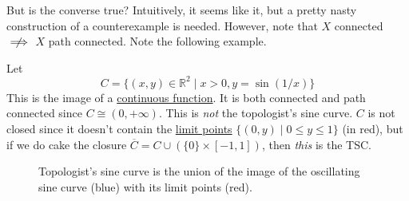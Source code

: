   But is the converse true? Intuitively, it seems like it, but a pretty nasty construction of a counterexample is needed. However, note that $X$ connected $\centernot\implies$ $X$ path connected. Note the following example. 

  \begin{example}
    \label{ex:topologists-sine-curve}
    Let 
    \begin{equation}
      C = \{ (x, y) \in \mathbb{R}^2 \mid x > 0, y = \sin(1/x) \}
    \end{equation} 
    This is the image of a \hyperref[def:continuous_func]{continuous function}. It is both connected and path connected since $C \cong (0, +\infty)$. This is \textit{not} the topologist's sine curve. $C$ is not closed since it doesn't contain the \hyperref[def:limit-point]{limit points} $\{(0, y) \mid 0 \leq y \leq 1 \}$ (in red), but if we do cake the closure $\overline{C} = C \cup (\{0\} \times [-1, 1])$, then \textit{this} is the TSC. 

    \begin{figure}[H]
      \centering 
      \caption{Topologist's sine curve is the union of the image of the oscillating sine curve (blue) with its limit points (red).} 
      \label{fig:top_sine_curve}
    \end{figure}


\end{example}
